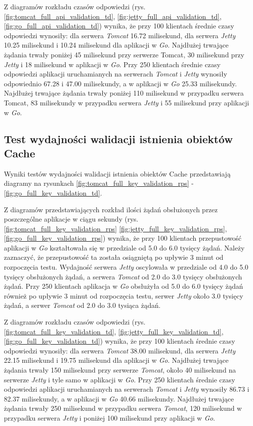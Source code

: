 Z diagramów rozkładu czasów odpowiedzi (rys. \ref{fig:tomcat_full_api_validation_td}, \ref{fig:jetty_full_api_validation_td}, \ref{fig:go_full_api_validation_td}) wynika, że przy 100 klientach średnie czasy odpowiedzi wynosiły: dla serwera \textsl{Tomcat} 16.72 milisekund, dla serwera \textsl{Jetty} 10.25 milisekund i 10.24 milisekund dla aplikacji w \textsl{Go}. Najdłużej trwające żądania trwały poniżej 45 milisekund przy serwerze Tomcat, 30 milisekund przy \textsl{Jetty} i 18 milisekund w aplikacji w \textsl{Go}. Przy 250 klientach średnie czasy odpowiedzi aplikacji uruchamianych na serwerach \textsl{Tomcat} i \textsl{Jetty} wynosiły odpowiednio 67.28 i 47.00 milisekundy, a w aplikacji w \textsl{Go} 25.33 milisekundy. Najdłużej trwające żądania trwały poniżej 110 milisekund w przypadku serwera Tomcat, 83 milisekundy w przypadku serwera \textsl{Jetty} i 55 milisekund przy aplikacji w \textsl{Go}.

% 
\clearpage

\subsection{Test wydajności walidacji istnienia obiektów Cache}
Wyniki testów wydajności walidacji istnienia obiektów Cache przedstawiają diagramy na rysunkach \ref{fig:tomcat_full_key_validation_rps} - \ref{fig:go_full_key_validation_td}.              

Z diagramów przedstawiających rozkład ilości żądań obsłużonych przez poszczególne aplikacje w ciągu sekundy  (rys. \ref{fig:tomcat_full_key_validation_rps} \ref{fig:jetty_full_key_validation_rps}, \ref{fig:go_full_key_validation_rps}) wynika, że przy 100 klientach przepustowość aplikacji w \textsl{Go} kształtowała się w przedziale od 5.0 do 6.0 tysięcy żądań. Należy zaznaczyć, że przepustowość ta została osiągniętą po upływie 3 minut od rozpoczęcia testu. Wydajność serwera \textsl{Jetty} oscylowała w przedziale od 4.0 do 5.0 tysięcy obsłużonych żądań, a serwera \textsl{Tomcat} od 2.0 do 3.0 tysięcy obsłużonych żądań. Przy 250 klientach aplikacja w \textsl{Go} obsłużyła od 5.0 do 6.0 tysięcy żądań również po upływie 3 minut od rozpoczęcia testu, serwer \textsl{Jetty} około 3.0 tysięcy żądań, a serwer \textsl{Tomcat} od 2.0 do 3.0 tysiąca żądań.

Z diagramów rozkładu czasów odpowiedzi (rys. \ref{fig:tomcat_full_key_validation_td}, \ref{fig:jetty_full_key_validation_td}, \ref{fig:go_full_key_validation_td}) wynika, że przy 100 klientach średnie czasy odpowiedzi wynosiły: dla serwera \textsl{Tomcat} 38.00 milisekund, dla serwera \textsl{Jetty} 22.15 milisekund i 19.75 milisekund dla aplikacji w \textsl{Go}. Najdłużej trwające żądania trwały 150 milisekund przy serwerze  \textsl{Tomcat}, około 40 milisekund na serwerze \textsl{Jetty} i tyle samo w aplikacji w \textsl{Go}. Przy 250 klientach średnie czasy odpowiedzi aplikacji uruchamianych na serwerach \textsl{Tomcat} i \textsl{Jetty} wynosiły 86.73 i 82.37 milisekundy, a w aplikacji w \textsl{Go} 40.66 milisekundy. Najdłużej trwające żądania trwały 250 milisekund w przypadku serwera  \textsl{Tomcat}, 120 milisekund w przypadku serwera \textsl{Jetty} i poniżej 100  milisekund przy aplikacji w \textsl{Go}.

